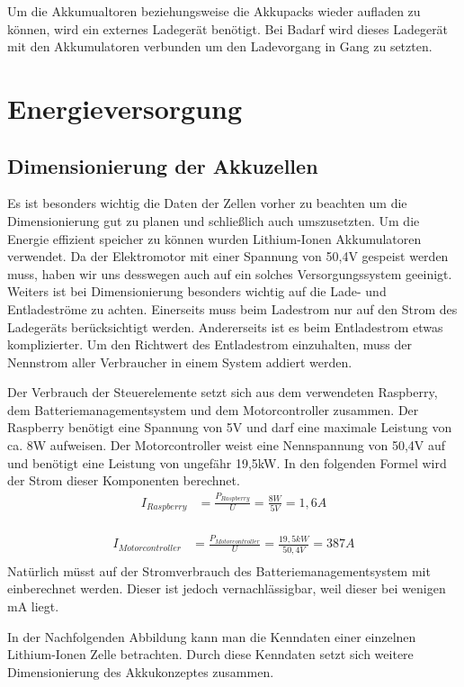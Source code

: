Um die Akkumualtoren beziehungsweise die Akkupacks wieder aufladen zu können, wird ein externes Ladegerät benötigt. Bei Badarf wird dieses Ladegerät mit den Akkumulatoren verbunden um den Ladevorgang in Gang zu setzten.
\newpage

\section{Energieversorgung}
\subsection{Dimensionierung der Akkuzellen}
Es ist besonders wichtig die Daten der Zellen vorher zu beachten um die Dimensionierung gut zu planen und schließlich auch umszusetzten. Um die Energie effizient speicher zu können wurden Lithium-Ionen Akkumulatoren verwendet. Da der Elektromotor mit einer Spannung von 50,4V gespeist werden muss, haben wir uns desswegen auch auf ein solches Versorgungssystem geeinigt. Weiters ist bei Dimensionierung besonders wichtig auf die Lade- und Entladeströme zu achten. Einerseits muss beim Ladestrom nur auf den Strom des Ladegeräts berücksichtigt werden. Andererseits ist es beim Entladestrom etwas komplizierter. Um den Richtwert des Entladestrom einzuhalten, muss der Nennstrom aller Verbraucher in einem System addiert werden.

Der Verbrauch der Steuerelemente setzt sich aus dem verwendeten Raspberry, dem Batteriemanagementsystem und dem Motorcontroller zusammen. Der Raspberry benötigt eine Spannung von 5V und darf eine maximale Leistung von ca. 8W aufweisen. Der Motorcontroller weist eine Nennspannung von 50,4V auf und benötigt eine Leistung von ungefähr 19,5kW. In den folgenden Formel wird der Strom dieser Komponenten berechnet.
\begin{align*}
I_{Raspberry} &= \frac{P_{Raspberry}}{U}=\frac{8 W}{5 V} = 1,6A\\
\end{align*}

\begin{align*}
I_{Motorcontroller} &= \frac{P_{Motorcontroller}}{U}=\frac{19,5 kW}{50,4 V} = 387 A\\
\end{align*}
Natürlich müsst auf der Stromverbrauch des Batteriemanagementsystem mit einberechnet werden. Dieser ist jedoch vernachlässigbar, weil dieser bei wenigen mA liegt.

In der Nachfolgenden Abbildung kann man die Kenndaten einer einzelnen Lithium-Ionen Zelle betrachten. Durch diese Kenndaten setzt sich weitere Dimensionierung des Akkukonzeptes zusammen. 

